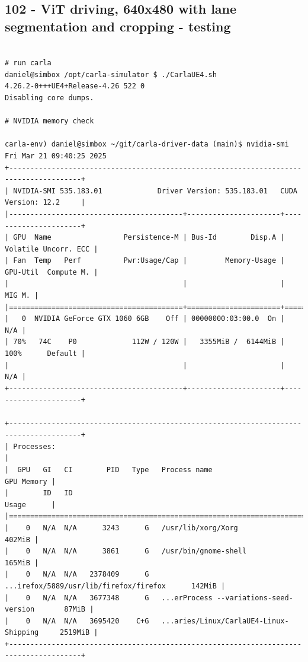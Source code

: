\subsection{102 - ViT driving, 640x480 with lane segmentation and cropping - testing}
\label{app_res:102}

\begin{verbatim}

# run carla
daniel@simbox /opt/carla-simulator $ ./CarlaUE4.sh 
4.26.2-0+++UE4+Release-4.26 522 0
Disabling core dumps.

# NVIDIA memory check

carla-env) daniel@simbox ~/git/carla-driver-data (main)$ nvidia-smi
Fri Mar 21 09:40:25 2025       
+---------------------------------------------------------------------------------------+
| NVIDIA-SMI 535.183.01             Driver Version: 535.183.01   CUDA Version: 12.2     |
|-----------------------------------------+----------------------+----------------------+
| GPU  Name                 Persistence-M | Bus-Id        Disp.A | Volatile Uncorr. ECC |
| Fan  Temp   Perf          Pwr:Usage/Cap |         Memory-Usage | GPU-Util  Compute M. |
|                                         |                      |               MIG M. |
|=========================================+======================+======================|
|   0  NVIDIA GeForce GTX 1060 6GB    Off | 00000000:03:00.0  On |                  N/A |
| 70%   74C    P0             112W / 120W |   3355MiB /  6144MiB |    100%      Default |
|                                         |                      |                  N/A |
+-----------------------------------------+----------------------+----------------------+
                                                                                         
+---------------------------------------------------------------------------------------+
| Processes:                                                                            |
|  GPU   GI   CI        PID   Type   Process name                            GPU Memory |
|        ID   ID                                                             Usage      |
|=======================================================================================|
|    0   N/A  N/A      3243      G   /usr/lib/xorg/Xorg                          402MiB |
|    0   N/A  N/A      3861      G   /usr/bin/gnome-shell                        165MiB |
|    0   N/A  N/A   2378409      G   ...irefox/5889/usr/lib/firefox/firefox      142MiB |
|    0   N/A  N/A   3677348      G   ...erProcess --variations-seed-version       87MiB |
|    0   N/A  N/A   3695420    C+G   ...aries/Linux/CarlaUE4-Linux-Shipping     2519MiB |
+---------------------------------------------------------------------------------------+


\end{verbatim}
